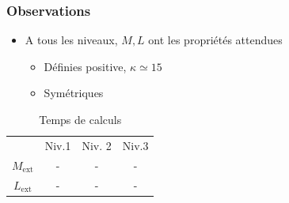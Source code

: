 \begin{frame}
\frametitle{Observations}
\begin{itemize}
  \item A tous les niveaux, $M,L$ ont les propriétés attendues
    \begin{itemize}
      \item Définies positive, $\kappa \simeq 15$
      \item Symétriques
    \end{itemize}
\end{itemize}


\begin{table}
\begin{tabular}{c|c|c|c}
 & Niv.1 & Niv. 2 & Niv.3\\
$M_{\text{ext}}$ & - & -& - \\
$L_{\text{ext}}$ & - & -& - \\
\end{tabular}
\caption{Temps de calculs}
\end{table}
\end{frame}

